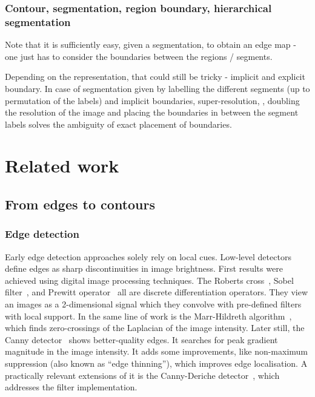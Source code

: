 \subsubsection*{Contour, segmentation, region boundary, hierarchical segmentation}

Note that it is sufficiently easy, given a segmentation, to obtain an edge map - one just has to consider the boundaries between the regions / segments. %

Depending on the representation, that could still be tricky - implicit and explicit boundary. In case of segmentation given by labelling the different segments (up to permutation of the labels) and implicit boundaries, super-resolution, \ie, doubling the resolution of the image and placing the boundaries in between the segment labels solves the ambiguity of exact placement of boundaries.

\section{Related work}
\subsection{From edges to contours}
\subsubsection{Edge detection}
Early edge detection approaches solely rely on local cues. Low-level detectors define edges as sharp discontinuities in image brightness. First results were achieved using digital image processing techniques. The Roberts cross~\cite{roberts1963machine}, Sobel filter~\cite{sobel19683x3}, and Prewitt operator~\cite{prewitt1970object} all are discrete differentiation operators. %
They view an images as a 2-dimensional signal which they convolve with pre-defined filters with local support. In the same line of work is the Marr-Hildreth algorithm~\cite{marr1980theory}, which finds zero-crossings of the Laplacian of the image intensity. Later still, the Canny detector~\cite{canny1986computational} shows better-quality edges. It searches for peak gradient magnitude in the image intensity. It adds some improvements, like non-maximum suppression (also known as ``edge thinning''), which improves edge localisation. A practically relevant extensions of it is the Canny-Deriche detector~\cite{deriche1987using}, which addresses the filter implementation.

